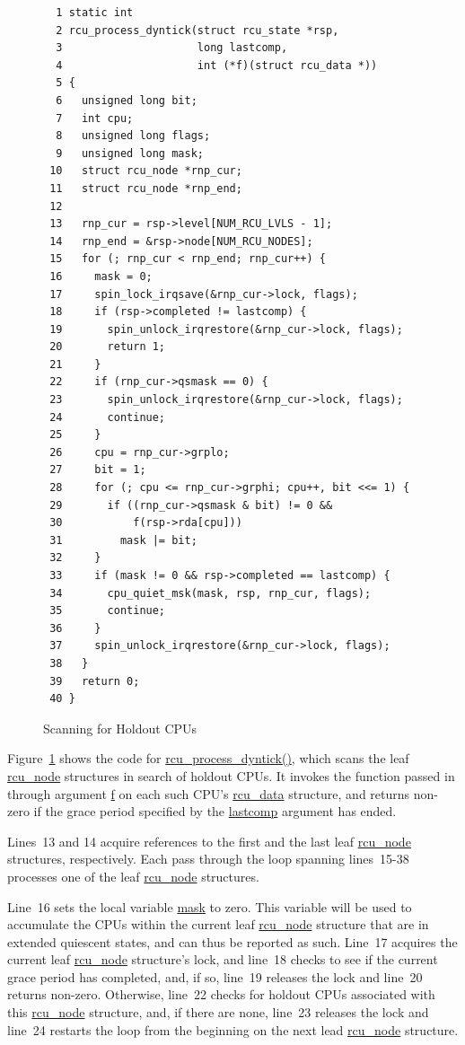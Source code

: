 \begin{figure}[tbp]
{ \scriptsize
\begin{verbatim}
  1 static int
  2 rcu_process_dyntick(struct rcu_state *rsp,
  3                     long lastcomp,
  4                     int (*f)(struct rcu_data *))
  5 {
  6   unsigned long bit;
  7   int cpu;
  8   unsigned long flags;
  9   unsigned long mask;
 10   struct rcu_node *rnp_cur;
 11   struct rcu_node *rnp_end;
 12 
 13   rnp_cur = rsp->level[NUM_RCU_LVLS - 1];
 14   rnp_end = &rsp->node[NUM_RCU_NODES];
 15   for (; rnp_cur < rnp_end; rnp_cur++) {
 16     mask = 0;
 17     spin_lock_irqsave(&rnp_cur->lock, flags);
 18     if (rsp->completed != lastcomp) {
 19       spin_unlock_irqrestore(&rnp_cur->lock, flags);
 20       return 1;
 21     }
 22     if (rnp_cur->qsmask == 0) {
 23       spin_unlock_irqrestore(&rnp_cur->lock, flags);
 24       continue;
 25     }
 26     cpu = rnp_cur->grplo;
 27     bit = 1;
 28     for (; cpu <= rnp_cur->grphi; cpu++, bit <<= 1) {
 29       if ((rnp_cur->qsmask & bit) != 0 &&
 30           f(rsp->rda[cpu]))
 31         mask |= bit;
 32     }
 33     if (mask != 0 && rsp->completed == lastcomp) {
 34       cpu_quiet_msk(mask, rsp, rnp_cur, flags);
 35       continue;
 36     }
 37     spin_unlock_irqrestore(&rnp_cur->lock, flags);
 38   }
 39   return 0;
 40 }
\end{verbatim}
}
\caption{Scanning for Holdout CPUs}
\label{fig:app:rcuimpl:rcutreewt:Scanning for Holdout CPUs}
\end{figure}

Figure~\ref{fig:app:rcuimpl:rcutreewt:Scanning for Holdout CPUs}
shows the code for \url{rcu_process_dyntick()}, which scans the
leaf \url{rcu_node} structures in search of holdout CPUs.
It invokes the function passed in through argument \url{f} on each
such CPU's \url{rcu_data} structure, and returns non-zero if
the grace period specified by the \url{lastcomp} argument has ended.

Lines~13 and 14 acquire references to the first and the last leaf
\url{rcu_node} structures, respectively.
Each pass through the loop spanning lines~15-38 processes one of
the leaf \url{rcu_node} structures.

Line~16 sets the local variable \url{mask} to zero.
This variable will be used to accumulate the CPUs within the current
leaf \url{rcu_node} structure that are in extended quiescent states, and
can thus be reported as such.
Line~17 acquires the current leaf \url{rcu_node} structure's lock,
and line~18 checks to see if the current grace period has completed,
and, if so, line~19 releases the lock and line~20 returns non-zero.
Otherwise, line~22 checks for holdout CPUs associated with this
\url{rcu_node} structure, and, if there are none, line~23 releases
the lock and line~24 restarts the loop from the beginning on the
next lead \url{rcu_node} structure.

